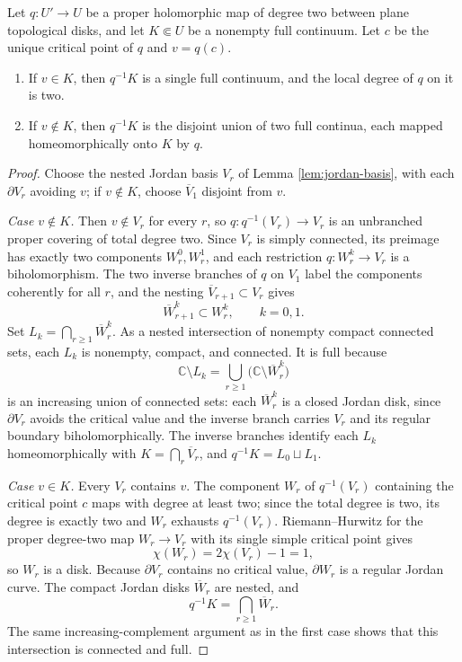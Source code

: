 \begin{lemma}\label{lem:quadratic-pullback}
Let \(q\colon U'\to U\) be a proper holomorphic map of degree two between plane topological disks, and let \(K\Subset U\) be a nonempty full continuum.  Let \(c\) be the unique critical point of \(q\) and \(v=q(c)\).
\begin{enumerate}
\item If \(v\in K\), then \(q^{-1}K\) is a single full continuum, and the local degree of \(q\) on it is two.
\item If \(v\notin K\), then \(q^{-1}K\) is the disjoint union of two full continua, each mapped homeomorphically onto \(K\) by \(q\).
\end{enumerate}
\end{lemma}

\begin{proof}
Choose the nested Jordan basis \(V_r\) of Lemma \ref{lem:jordan-basis}, with each \(\partial V_r\) avoiding \(v\); if \(v\notin K\), choose \(\overline V_1\) disjoint from \(v\).

\emph{Case \(v\notin K\).}  Then \(v\notin V_r\) for every \(r\), so
\(q\colon q^{-1}(V_r)\to V_r\)
is an unbranched proper covering of total degree two.  Since \(V_r\) is simply connected, its preimage has exactly two components \(W_r^0,W_r^1\), and each restriction \(q\colon W_r^k\to V_r\) is a biholomorphism.  The two inverse branches of \(q\) on \(V_1\) label the components coherently for all \(r\), and the nesting \(\overline V_{r+1}\subset V_r\) gives
\[
 \overline W_{r+1}^k\subset W_r^k,\qquad k=0,1.
\]
Set \(L_k=\bigcap_{r\ge1}\overline W_r^k\).  As a nested intersection of nonempty compact connected sets, each \(L_k\) is nonempty, compact, and connected.  It is full because
\[
 \mathbb C\setminus L_k=\bigcup_{r\ge1}\bigl(\mathbb C\setminus\overline W_r^k\bigr)
\]
is an increasing union of connected sets: each \(\overline W_r^k\) is a closed Jordan disk, since \(\partial V_r\) avoids the critical value and the inverse branch carries \(V_r\) and its regular boundary biholomorphically.  The inverse branches identify each \(L_k\) homeomorphically with \(K=\bigcap_r\overline V_r\), and \(q^{-1}K=L_0\sqcup L_1\).

\emph{Case \(v\in K\).}  Every \(V_r\) contains \(v\).  The component \(W_r\) of \(q^{-1}(V_r)\) containing the critical point \(c\) maps with degree at least two; since the total degree is two, its degree is exactly two and \(W_r\) exhausts \(q^{-1}(V_r)\).  Riemann--Hurwitz for the proper degree-two map \(W_r\to V_r\) with its single simple critical point gives
\[
 \chi(W_r)=2\chi(V_r)-1=1,
\]
so \(W_r\) is a disk.  Because \(\partial V_r\) contains no critical value, \(\partial W_r\) is a regular Jordan curve.  The compact Jordan disks \(\overline W_r\) are nested, and
\[
 q^{-1}K=\bigcap_{r\ge1}\overline W_r.
\]
The same increasing-complement argument as in the first case shows that this intersection is connected and full.


\end{proof}
